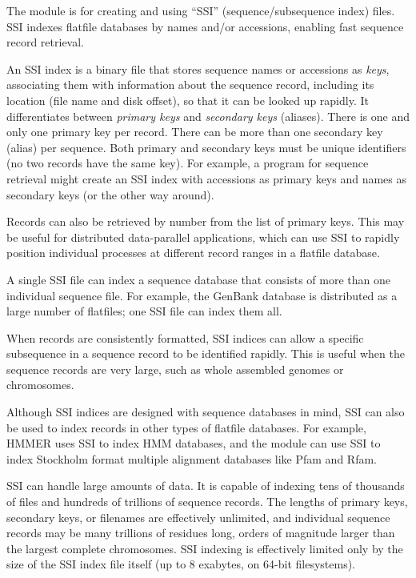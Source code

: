The  module is for creating and using ``SSI''
(sequence/subsequence index) files. SSI indexes flatfile databases by
names and/or accessions, enabling fast sequence record retrieval. 

An SSI index is a binary file that stores sequence names or accessions
as \emph{keys}, associating them with information about the sequence
record, including its location (file name and disk offset), so that it
can be looked up rapidly. It differentiates between \emph{primary
keys} and \emph{secondary keys} (aliases).  There is one and only one
primary key per record. There can be more than one secondary key
(alias) per sequence. Both primary and secondary keys must be unique
identifiers (no two records have the same key). For example, a program
for sequence retrieval might create an SSI index with accessions as
primary keys and names as secondary keys (or the other way around).

Records can also be retrieved by number from the list of primary keys.
This may be useful for distributed data-parallel applications, which
can use SSI to rapidly position individual processes at different
record ranges in a flatfile database.

A single SSI file can index a sequence database that consists of more
than one individual sequence file. For example, the GenBank database
is distributed as a large number of flatfiles; one SSI file can index
them all.

When records are consistently formatted, SSI indices can allow a
specific subsequence in a sequence record to be identified
rapidly. This is useful when the sequence records are very large, such
as whole assembled genomes or chromosomes.

Although SSI indices are designed with sequence databases in mind, SSI
can also be used to index records in other types of flatfile
databases. For example, HMMER uses SSI to index HMM databases, and the
 module can use SSI to index Stockholm format multiple
alignment databases like Pfam and Rfam.

SSI can handle large amounts of data. It is capable of indexing tens
of thousands of files and hundreds of trillions of sequence records.
The lengths of primary keys, secondary keys, or filenames are
effectively unlimited, and individual sequence records may be many
trillions of residues long, orders of magnitude larger than the
largest complete chromosomes. SSI indexing is effectively limited only
by the size of the SSI index file itself (up to 8 exabytes, on 64-bit
filesystems).

